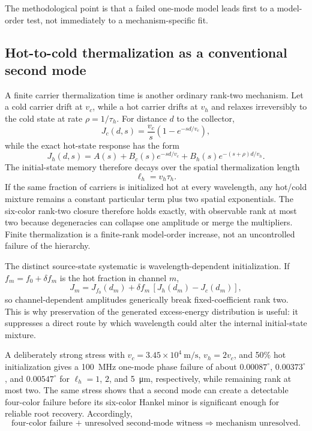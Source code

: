 \documentclass[11pt]{article}
\begin{document}
The methodological point is that a failed one-mode model leads first to a model-order test, not immediately to a mechanism-specific fit.

\subsection{Hot-to-cold thermalization as a conventional second mode}

A finite carrier thermalization time is another ordinary rank-two mechanism. Let a cold carrier drift at $v_c$, while a hot carrier drifts at $v_h$ and relaxes irreversibly to the cold state at rate $\rho=1/\tau_h$. For distance $d$ to the collector,
\begin{equation}
J_c(d,s)=\frac{v_c}{s}\left(1-e^{-sd/v_c}\right),
\end{equation}
while the exact hot-state response has the form
\begin{equation}
\boxed{J_h(d,s)=A(s)+B_c(s)e^{-sd/v_c}+B_h(s)e^{-(s+\rho)d/v_h}.}
\label{eq:hot_two_mode}
\end{equation}
The initial-state memory therefore decays over the spatial thermalization length
\begin{equation}
\boxed{\ell_h=v_h\tau_h.}
\end{equation}
If the same fraction of carriers is initialized hot at every wavelength, any hot/cold mixture remains a constant particular term plus two spatial exponentials. The six-color rank-two closure therefore holds exactly, with observable rank at most two because degeneracies can collapse one amplitude or merge the multipliers. Finite thermalization is a finite-rank model-order increase, not an uncontrolled failure of the hierarchy.

The distinct source-state systematic is wavelength-dependent initialization. If $f_m=f_0+\delta f_m$ is the hot fraction in channel $m$,
\begin{equation}
J_m=J_{f_0}(d_m)+\delta f_m\,[J_h(d_m)-J_c(d_m)],
\end{equation}
so channel-dependent amplitudes generically break fixed-coefficient rank two. This is why preservation of the generated excess-energy distribution is useful: it suppresses a direct route by which wavelength could alter the internal initial-state mixture.

A deliberately strong stress with $v_c=3.45\times10^4~\mathrm{m/s}$, $v_h=2v_c$, and 50\% hot initialization gives a \SI{100}{MHz} one-mode phase failure of about $0.00087^\circ$, $0.00373^\circ$, and $0.00547^\circ$ for $\ell_h=1$, $2$, and \SI{5}{\micro\meter}, respectively, while remaining rank at most two. The same stress shows that a second mode can create a detectable four-color failure before its six-color Hankel minor is significant enough for reliable root recovery. Accordingly,
\begin{equation*}
\boxed{\text{four-color failure + unresolved second-mode witness}\Rightarrow\text{mechanism unresolved}.}
\end{equation*}
\end{document}
